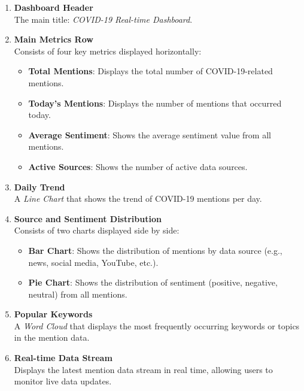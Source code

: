 \documentclass[12pt,a4paper]{article}
\begin{document}
\begin{enumerate}
    \item \textbf{Dashboard Header} \\
    The main title: \textit{COVID-19 Real-time Dashboard}.
    
    \item \textbf{Main Metrics Row} \\
    Consists of four key metrics displayed horizontally:
    \begin{itemize}
        \item \textbf{Total Mentions}: Displays the total number of COVID-19-related mentions.
        \item \textbf{Today's Mentions}: Displays the number of mentions that occurred today.
        \item \textbf{Average Sentiment}: Shows the average sentiment value from all mentions.
        \item \textbf{Active Sources}: Shows the number of active data sources.
    \end{itemize}
    
    \item \textbf{Daily Trend} \\
    A \textit{Line Chart} that shows the trend of COVID-19 mentions per day.
    
    \item \textbf{Source and Sentiment Distribution} \\
    Consists of two charts displayed side by side:
    \begin{itemize}
        \item \textbf{Bar Chart}: Shows the distribution of mentions by data source (e.g., news, social media, YouTube, etc.).
        \item \textbf{Pie Chart}: Shows the distribution of sentiment (positive, negative, neutral) from all mentions.
    \end{itemize}
    
    \item \textbf{Popular Keywords} \\
    A \textit{Word Cloud} that displays the most frequently occurring keywords or topics in the mention data.
    
    \item \textbf{Real-time Data Stream} \\
    Displays the latest mention data stream in real time, allowing users to monitor live data updates.
\end{enumerate}
\end{document}
